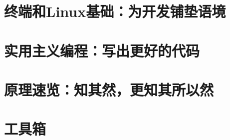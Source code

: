 \documentclass[openany,fontset=none, oneside]{ctexbook}
\begin{document}
\part{终端和Linux基础：为开发铺垫语境}





% 
% 
% 
% 
% 
% 
% 
% 
% 

\part{实用主义编程：写出更好的代码}






% 

\part{原理速览：知其然，更知其所以然}







\part{工具箱}






% 
% 

\backmatter

\end{document}
